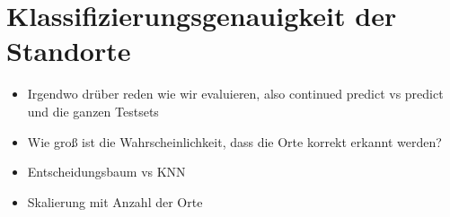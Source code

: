 \section{Klassifizierungsgenauigkeit der Standorte}
\begin{itemize}
    \item Irgendwo drüber reden wie wir evaluieren, also continued predict vs predict und die ganzen Testsets
    \item Wie groß ist die Wahrscheinlichkeit, dass die Orte korrekt erkannt werden?
    \item Entscheidungsbaum vs KNN
    \item Skalierung mit Anzahl der Orte
\end{itemize}
